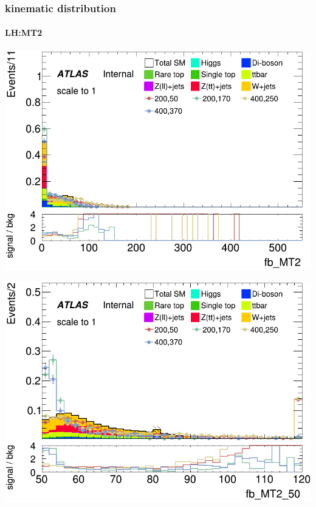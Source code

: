 \documentclass[usenames,dvipsnames]{beamer}
\begin{document}
\begin{frame}
\frametitle{kinematic distribution}
\framesubtitle{LH:MT2}
    \begin{minipage}{0.32\textwidth}
        \centering
        \includegraphics[width=\textwidth]{graphics/LH_met_sig/LH_fb_MT2_norm.png}
    \end{minipage}
    \hfill
    \begin{minipage}{0.32\textwidth}
        \centering
        \includegraphics[width=\textwidth]{graphics/LH_met_sig/LH_fb_MT2_50_norm.png}
    \end{minipage}
    \hfill
    \begin{minipage}{0.32\textwidth}
        \centering

\end{minipage}
\end{frame}
\end{document}
